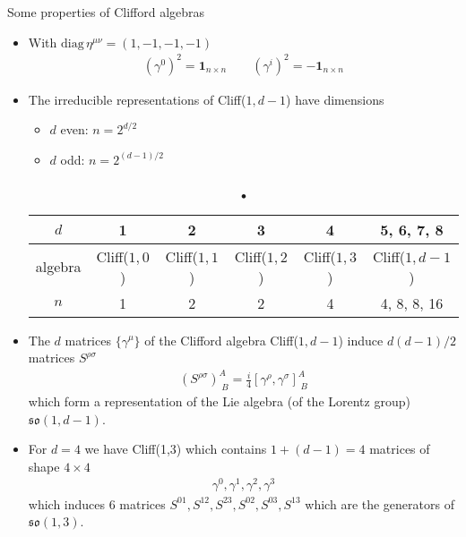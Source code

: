 \documentclass[../main.tex]{subfiles}
\begin{document}
Some properties of Clifford algebras
\begin{itemize}
\item With $\text{diag}\,\eta^{\mu\nu}=(1,-1,-1,-1)$
\begin{align}
(\gamma^0)^2=\mathbf{1}_{n\times n}\qquad(\gamma^i)^2=-\mathbf{1}_{n\times n}
\end{align}
\item The irreducible representations of Cliff($1,d-1$) have dimensions
\begin{itemize}
\item $d$ even: $n=2^{d/2}$
\item $d$ odd: $n=2^{(d-1)/2}$
\end{itemize}

\begin{center}
\begin{table}[h]
\centering
\begin{tabular}{|c|c|c|c|c|c|}
\hline
$d$ & 1            & 2            & 3            & 4            & 5, 6, 7, 8\\ \hline\hline
algebra    & Cliff($1,0$) & Cliff($1,1$) & Cliff($1,2$) &   Cliff($1,3$) & Cliff($1,d-1$)\\ \hline
$n$ & 1            & 2            & 2            & 4            & 
4, 8, 8, 16\\ \hline
\end{tabular}
\caption{•}
\end{table}
\end{center}

\item The $d$ matrices $\{\gamma^\mu\}$ of the Clifford algebra Cliff($1,d-1$) induce $d(d-1)/2$ matrices $S^{\rho\sigma}$  
\begin{align}
(S^{\rho\sigma})^A_{\;B}=\frac{i}{4}[\gamma^\rho,\gamma^\sigma]^A_{\;B}
\end{align}
which form a representation of the Lie algebra (of the Lorentz group) $\mathfrak{so}(1,d-1)$.

\item For $d=4$ we have Cliff(1,3) which contains $1+(d-1)=4$ matrices of shape $4\times4$
\begin{align}
\gamma^0, \gamma^1, \gamma^2, \gamma^3
\end{align}
which induces 6 matrices $S^{01}, S^{12}, S^{23}, S^{02}, S^{03}, S^{13}$ which are the generators of $\mathfrak{so}(1,3)$.


\end{itemize}
\end{document}
